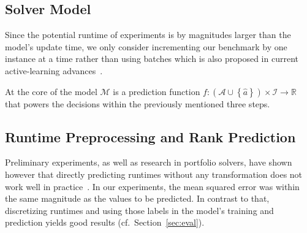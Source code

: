 \documentclass[runningheads]{llncs}
\begin{document}
\subsection{Solver Model}
\label{sec:main-model}


Since the potential runtime of experiments is by magnitudes larger than the model's update time, we only consider incrementing our benchmark by one instance at a time rather than using batches which is also proposed in current active-learning advances~\cite{SinhaED19,2019gaal}.

At the core of the model $\mathcal{M}$ is a prediction function $f\!: \left(\mathcal{A} \cup \left\lbrace \hat{a} \right\rbrace\right) \times \mathcal{I} \rightarrow \mathbb{R}$ that powers the decisions within the previously mentioned three steps.



\subsection{Runtime Preprocessing and Rank Prediction}
\label{sec:main1}


Preliminary experiments, as well as research in portfolio solvers, have shown however that directly predicting runtimes without any transformation does not work well in practice~\cite{NgokoCT19,CollauttiMMO13}.
In our experiments, the mean squared error was within the same magnitude as the values to be predicted.
In contrast to that, discretizing runtimes and using those labels in the model's training and prediction yields good results (cf.~Section~\ref{sec:eval}).
\end{document}
